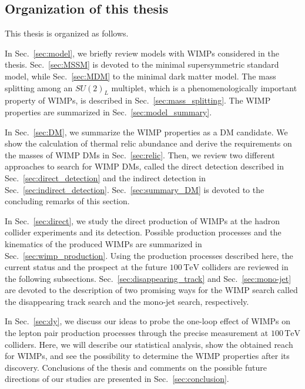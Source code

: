 \documentclass[12pt,twoside,book]{article}
\begin{document}
\subsection{Organization of this thesis}

This thesis is organized as follows.

In Sec.~\ref{sec:model}, we briefly review models with WIMPs considered in the thesis.
Sec.~\ref{sec:MSSM} is devoted to the minimal supersymmetric standard model, while Sec.~\ref{sec:MDM} to the minimal dark matter model.
The mass splitting among an $SU(2)_L$ multiplet, which is a phenomenologically important property of WIMPs, is described in Sec.~\ref{sec:mass_splitting}.
The WIMP properties are summarized in Sec.~\ref{sec:model_summary}.

In Sec.~\ref{sec:DM}, we summarize the WIMP properties as a DM candidate.
We show the calculation of thermal relic abundance and derive the requirements on the masses of WIMP DMs in Sec.~\ref{sec:relic}.
Then, we review two different approaches to search for WIMP DMs, called the direct detection described in Sec.~\ref{sec:direct_detection} and the indirect detection in Sec.~\ref{sec:indirect_detection}.
Sec.~\ref{sec:summary_DM} is devoted to the concluding remarks of this section.

In Sec.~\ref{sec:direct}, we study the direct production of WIMPs at the hadron collider experiments and its detection.
Possible production processes and the kinematics of the produced WIMPs are summarized in Sec.~\ref{sec:wimp_production}.
Using the production processes described here, the current status and the prospect at the future $100\,\mathrm{TeV}$ colliders are reviewed in the following subsections.
Sec.~\ref{sec:disappearing_track} and Sec.~\ref{sec:mono-jet} are devoted to the description of two promising ways for the WIMP search called the disappearing track search and the mono-jet search, respectively.

In Sec.~\ref{sec:dy}, we discuss our ideas to probe the one-loop effect of WIMPs on the lepton pair production processes through the precise measurement at $100\,\mathrm{TeV}$ colliders.
Here, we will describe our statistical analysis, show the obtained reach for WIMPs, and see the possibility to determine the WIMP properties after its discovery.
Conclusions of the thesis and comments on the possible future directions of our studies are presented in Sec.~\ref{sec:conclusion}.
\end{document}
